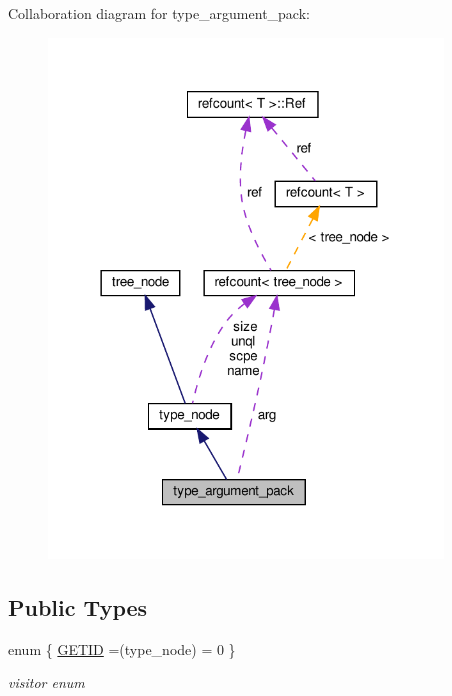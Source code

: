 Collaboration diagram for type\+\_\+argument\+\_\+pack\+:
\nopagebreak
\begin{figure}[H]
\begin{center}
\leavevmode
\includegraphics[width=297pt]{d5/d97/structtype__argument__pack__coll__graph}
\end{center}
\end{figure}
\subsection*{Public Types}
\begin{DoxyCompactItemize}
\item 
enum \{ \hyperlink{structtype__argument__pack_a590c7bd660db11f7d64f0f57d0e046d0a21df64dfcd09c310c16ff5980cd66e2c}{G\+E\+T\+ID} =(type\+\_\+node) = 0
 \}\begin{DoxyCompactList}\small\item\em visitor enum \end{DoxyCompactList}
\end{DoxyCompactItemize}
